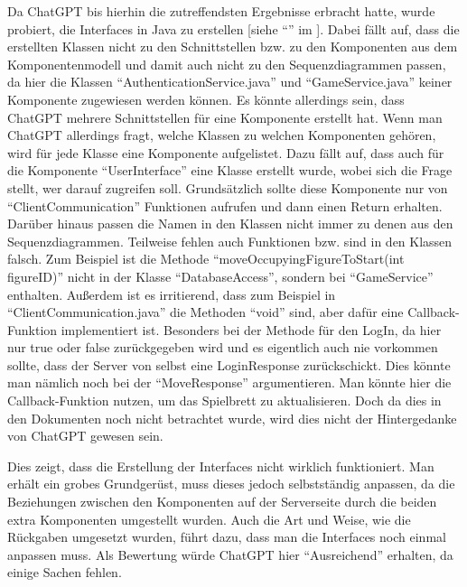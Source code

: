 Da ChatGPT bis hierhin die zutreffendsten Ergebnisse erbracht hatte, wurde probiert, die Interfaces in Java zu erstellen 
[siehe ``'' im ]. Dabei fällt auf, dass die erstellten Klassen nicht zu den Schnittstellen 
bzw. zu den Komponenten aus dem Komponentenmodell und damit auch 
nicht zu den Sequenzdiagrammen passen, da hier die Klassen ``AuthenticationService.java'' und ``GameService.java'' keiner Komponente 
zugewiesen werden können. Es könnte allerdings sein, dass ChatGPT mehrere Schnittstellen für eine Komponente erstellt hat. Wenn 
man ChatGPT allerdings fragt, welche Klassen zu welchen Komponenten gehören, wird für jede Klasse eine Komponente aufgelistet. Dazu fällt auf, dass 
auch für die Komponente ``UserInterface'' eine Klasse erstellt wurde, wobei sich die Frage stellt, wer darauf zugreifen soll. 
Grundsätzlich sollte diese Komponente nur von ``ClientCommunication'' Funktionen aufrufen und dann einen Return erhalten. Darüber hinaus 
passen die Namen in den Klassen nicht immer zu denen aus den Sequenzdiagrammen. Teilweise fehlen auch Funktionen bzw. sind in den 
Klassen falsch. Zum Beispiel ist die Methode ``moveOccupyingFigureToStart(int figureID)'' nicht in der Klasse ``DatabaseAccess'', sondern 
bei ``GameService'' enthalten. Außerdem ist es irritierend, dass zum Beispiel in ``ClientCommunication.java'' die Methoden ``void'' sind, 
aber dafür eine Callback-Funktion implementiert ist. Besonders bei der Methode für den LogIn, da hier nur true oder false 
zurückgegeben wird und es eigentlich auch nie vorkommen sollte, dass der Server von selbst eine LoginResponse zurückschickt. Dies 
könnte man nämlich noch bei der ``MoveResponse'' argumentieren. Man könnte hier die Callback-Funktion nutzen, um das Spielbrett 
zu aktualisieren. Doch da dies in den Dokumenten noch nicht betrachtet wurde, wird dies nicht der Hintergedanke von 
ChatGPT gewesen sein.

Dies zeigt, dass die Erstellung der Interfaces nicht wirklich funktioniert. Man erhält ein grobes 
Grundgerüst, muss dieses jedoch selbstständig anpassen, da die Beziehungen zwischen den Komponenten auf der Serverseite durch die 
beiden extra Komponenten umgestellt wurden. Auch die Art und Weise, wie die Rückgaben umgesetzt wurden, führt dazu, dass man die 
Interfaces noch einmal anpassen muss. Als Bewertung würde ChatGPT hier ``Ausreichend'' erhalten, da einige Sachen fehlen.
